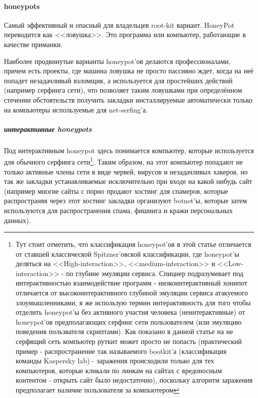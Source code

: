 \paragraph{honeypots\\}
\label{honeypots_in_general}
Самый эффективный и опасный для владельцев root-kit вариант. HoneyPot
переводится как <<ловушка>>. Это программа или компьютер, работающие в
качестве приманки.

Наиболее продвинутые варианты honeypot'ов делаются профессионалами,
причем есть проекты, где машина ловушка не просто пассивно ждет, когда
на неё попадет  незадачливый взломщик, а  используется для простейших
действий (например серфинга сети), что позволяет таким ловушками при
определённом стечении обстоятельств получить закладки инсталлируемые
автоматически только на компьютеры используемые для net-serfing'а.

\subparagraph{интерактивные honeypots\\}
Под интерактивным honeypot здесь понимается компьютер, которые
используется для обычного серфинга сети\footnote{Тут стоит отметить,
что классификация honeypot'ов в этой статье отличается от ставшей классической
Spitzner'овской классификации, где honeypot'ы деляться на <<High-interaction>>,
<<medium-interaction>> и <<Low-interaction>> - по глубине эмуляции сервиса.
Спицнер подразумевает под интерактивностью взаимодействие программ -
низкоинтерактивный хонипот отличается от высокоинтерактивного глубиной
 эмуляции сервиса атакуемого злоумышленниками, я же использую термин
 интерактивность для того чтобы отделить honeypot'ы без
активного участия человека (неинтерактивные) от honeypot'ов предполагающих
 серфинг сети пользователем (или эмуляцию поведения пользвателя скриптами).
Как показано в данной статье на не серфящий сеть компьютер руткит может
просто не попасть (практический пример - распространение так называемого
 bootkit'а (классификация команды Kaspersky lab) - заражения происходили
 только для тех компьютеров, которые кликали по линкам на сайтах с вредоносным
 контентом - открыть сайт было недостаточно), поскольку алгоритм заражения
 предполагает наличие пользователя за компьютером}. Таким образом, на
 этот компьютер попадают не только активные члены сети в виде червей, вирусов и
незадачливых хакеров, но так же закладки устанавливаемые исключительно
при входе на какой нибудь сайт (например многие сайты с порно продают
хостинг для спамеров, которые распространяя через этот хостинг закладки
организуют botnet'ы, которые затем используются для распространения
спама, фишинга и кражи персональных данных).

